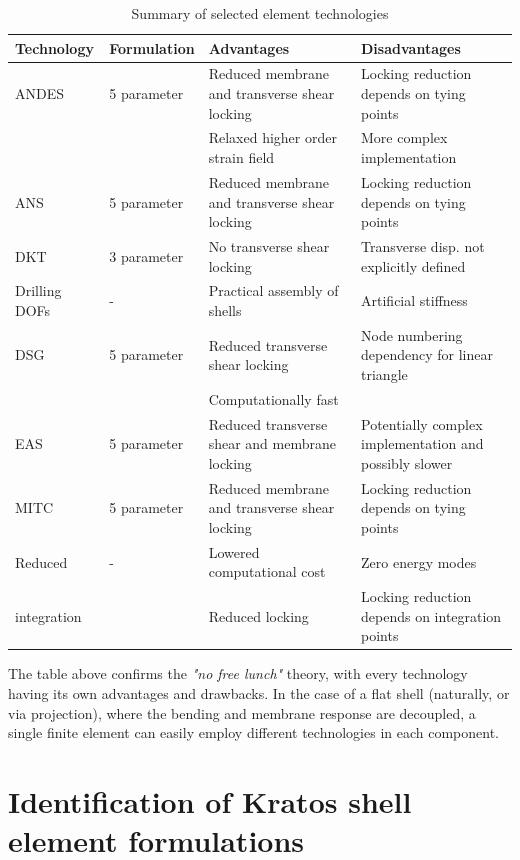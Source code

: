 \begin{table}[H]
	\onehalfspacing
	\begin{tabularx}{\textwidth}{ | l | l |  X | X | }
		\hline
		\textbf{Technology} 		& 	\textbf{Formulation}	&		\textbf{Advantages}	&		\textbf{Disadvantages}\\
		\hline
		ANDES	& 5 parameter &	Reduced membrane and transverse shear locking &  Locking reduction depends on tying points \\
		\ &\  & Relaxed higher order strain field & More complex implementation \\
		\hline
		ANS & 5 parameter		&  Reduced membrane and transverse shear locking & Locking reduction depends on tying points \\
		\hline
		DKT	&  3 parameter		 & 	No transverse shear locking & Transverse disp. not explicitly defined \\
		\hline
		Drilling DOFs	  &  - & Practical assembly of shells & Artificial stiffness \\
		\hline
		DSG	&	 5 parameter	& Reduced transverse shear locking	& Node numbering dependency for linear triangle \\
		\ &\  & Computationally fast & \  \\
		\hline
		EAS 	  &		  5 parameter		&		Reduced transverse shear and membrane locking & Potentially complex implementation and possibly slower \\
		\hline
		MITC	&		5 parameter	&		Reduced membrane and transverse shear locking & Locking reduction depends on tying points \\
		\hline
		Reduced &		-		&	 Lowered computational cost & Zero energy modes \\
		integration &\  & Reduced locking & Locking reduction depends on integration points \\ 
		\hline
	\end{tabularx}
	\caption{Summary of selected element technologies}
	\label{table:1}
\end{table}

The table above confirms the \textit{"no free lunch"} theory, with every technology having its own advantages and drawbacks. In the case of a flat shell (naturally, or via projection), where the bending and membrane response are decoupled, a single finite element can easily employ different technologies in each component. 

\section{Identification of Kratos shell element formulations}

